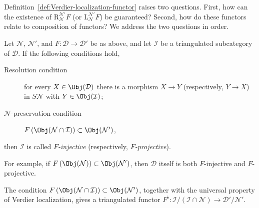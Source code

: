 Definition~\ref{def:Verdier-localization-functor} raises two questions. First,
how can the existence of $\mathrm{R}^{\mathcal{N}'}_{\mathcal{N}}F$ (or
$\mathrm{L}^{\mathcal{N}'}_{\mathcal{N}}F$) be guaranteed? Second, how do
these functors relate to composition of functors? We address the two questions
in order.

\begin{definition}\label{def:F-injective}
	Let $\mathcal{N}$, $\mathcal{N}'$, and
	$F: \mathcal{D} \to \mathcal{D}'$ be as above, and let $\mathcal{I}$ be a
	triangulated subcategory of $\mathcal{D}$. If the following conditions hold,
	\begin{description}
		\item[Resolution condition] for every $X \in \Obj(\mathcal{D})$ there is
		a morphism $X \to Y$ (respectively, $Y \to X$) in $S\mathcal{N}$ with
		$Y \in \Obj(\mathcal{I})$;
		\item[$\mathcal{N}$-preservation condition]
		$F\left(\Obj(\mathcal{N}\cap\mathcal{I})\right)
		\subset \Obj(\mathcal{N}')$,
	\end{description}
	then $\mathcal{I}$ is called \emph{$F$-injective} (respectively,
	\emph{$F$-projective}).
\end{definition}

For example, if
$F\left(\Obj(\mathcal{N})\right) \subset \Obj(\mathcal{N}')$, then
$\mathcal{D}$ itself is both $F$-injective and $F$-projective.

The condition
$F\left(\Obj(\mathcal{N}\cap\mathcal{I})\right)\subset\Obj(\mathcal{N}')$,
together with the universal property of Verdier localization, gives a
triangulated functor
$F^\flat: \mathcal{I}/(\mathcal{I}\cap\mathcal{N})
\to \mathcal{D}'/\mathcal{N}'$.

